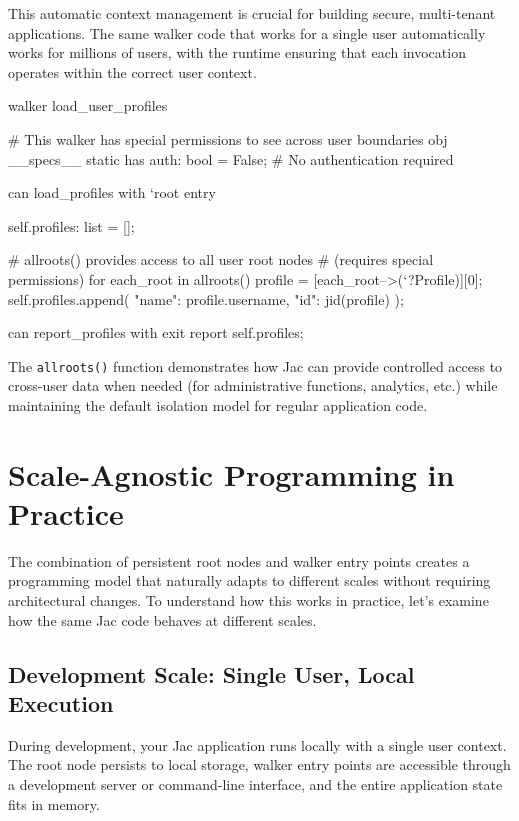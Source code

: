 This automatic context management is crucial for building secure, multi-tenant applications. The same walker code that works for a single user automatically works for millions of users, with the runtime ensuring that each invocation operates within the correct user context.

\begin{jacblock}
walker load_user_profiles {
    # This walker has special permissions to see across user boundaries
    obj __specs__ {
        static has auth: bool = False;  # No authentication required
    }

    can load_profiles with `root entry {
        self.profiles: list = [];

        # allroots() provides access to all user root nodes
        # (requires special permissions)
        for each_root in allroots() {
            profile = [each_root-->(`?Profile)][0];
            self.profiles.append({
                "name": profile.username,
                "id": jid(profile)
            });
        }
    }

    can report_profiles with exit {
        report self.profiles;
    }
}
\end{jacblock}

The \texttt{allroots()} function demonstrates how Jac can provide controlled access to cross-user data when needed (for administrative functions, analytics, etc.) while maintaining the default isolation model for regular application code.

\section{Scale-Agnostic Programming in Practice}

The combination of persistent root nodes and walker entry points creates a programming model that naturally adapts to different scales without requiring architectural changes. To understand how this works in practice, let's examine how the same Jac code behaves at different scales.

\subsection{Development Scale: Single User, Local Execution}

During development, your Jac application runs locally with a single user context. The root node persists to local storage, walker entry points are accessible through a development server or command-line interface, and the entire application state fits in memory.

